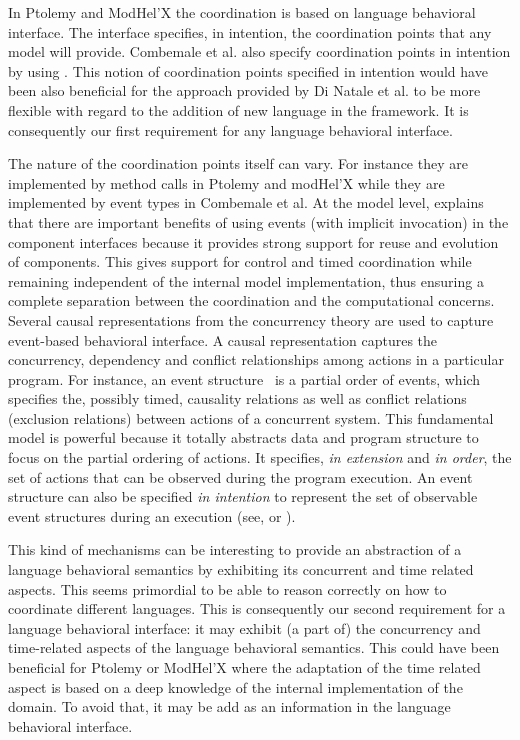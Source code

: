 In Ptolemy and ModHel'X the coordination is based on language behavioral interface. The interface specifies, in intention, the coordination points that any model will provide. Combemale et al. also specify coordination points in intention by using \dse. This notion of coordination points specified in intention would have been also beneficial for the approach provided by Di Natale et al. to be more flexible with regard to the addition of new language in the framework. It is consequently our first requirement for any language behavioral interface.

The nature of the coordination points itself can vary. For instance they are implemented by method calls in Ptolemy and modHel'X while they are implemented by event types in Combemale et al. At the model level, \cite{garlansoftarchbib} explains that there are important benefits of using events (with implicit invocation) in the component interfaces because it provides strong support for reuse and evolution of components.
This gives support for control and timed coordination while remaining independent of the internal model implementation, thus ensuring a complete separation between the coordination and the computational concerns. Several causal representations from the concurrency theory are used to capture event-based behavioral interface. A causal representation captures the concurrency, dependency and conflict relationships among actions in a particular program. For instance, an event structure~\cite{eventStructures} is a partial order of events, which specifies the, possibly timed, causality relations as well as conflict relations (\ie exclusion relations) between actions of a concurrent system. This fundamental model is powerful because it totally abstracts data and program structure to focus on the partial ordering of actions. It specifies, \emph{in extension} and \emph{in order}, the set of actions that can be observed during the program execution. An event structure can also be specified \emph{in intention} to represent the set of observable event structures during an execution (see, \eg\cite{ccslbib} or \cite{tagmachinebib}).

This kind of mechanisms can be interesting to provide an abstraction of a language behavioral semantics by exhibiting its concurrent and time related aspects. This seems primordial to be able to reason correctly on how to coordinate different languages. This is consequently our second requirement for a language behavioral interface: it may exhibit (a part of) the concurrency and time-related aspects of the language behavioral semantics. This could have been beneficial for Ptolemy or ModHel'X where the adaptation of the time related aspect is based on a deep knowledge of the internal implementation of the domain. To avoid that, it may be add as an information in the language behavioral interface.

